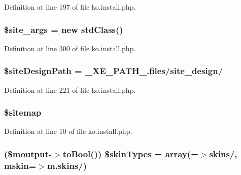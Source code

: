 Definition at line 197 of file ko.\+install.\+php.

\hypertarget{ko_8install_8php_a19e0fcfacd69155c9cc255e5500f6ccc}{}
\subsubsection[{\$site\+\_\+args}]{\setlength{\rightskip}{0pt plus 5cm}\$site\+\_\+args = new std\+Class()}\label{ko_8install_8php_a19e0fcfacd69155c9cc255e5500f6ccc}


Definition at line 300 of file ko.\+install.\+php.

\hypertarget{ko_8install_8php_a0b79a974b91157b79d83cc0be7e3247c}{}
\subsubsection[{\$site\+Design\+Path}]{\setlength{\rightskip}{0pt plus 5cm}\$site\+Design\+Path = \+\_\+\+X\+E\+\_\+\+P\+A\+T\+H\+\_\+.\textquotesingle{}files/site\+\_\+design/\textquotesingle{}}\label{ko_8install_8php_a0b79a974b91157b79d83cc0be7e3247c}


Definition at line 221 of file ko.\+install.\+php.

\hypertarget{ko_8install_8php_ae7b8fee391a6d8b9162de5b69b9dc07f}{}
\subsubsection[{\$sitemap}]{\setlength{\rightskip}{0pt plus 5cm}\$sitemap}\label{ko_8install_8php_ae7b8fee391a6d8b9162de5b69b9dc07f}


Definition at line 10 of file ko.\+install.\+php.

\hypertarget{ko_8install_8php_aa61073b7b359568eb3459da113fd8cdf}{}
\subsubsection[{\$skin\+Types}]{ (\$moutput-\/$>$to\+Bool()) \$skin\+Types = array(\textquotesingle{}=$>$\textquotesingle{}skins/\textquotesingle{}, \textquotesingle{}mskin\textquotesingle{}=$>$\textquotesingle{}m.\+skins/\textquotesingle{})}\label{ko_8install_8php_aa61073b7b359568eb3459da113fd8cdf}


